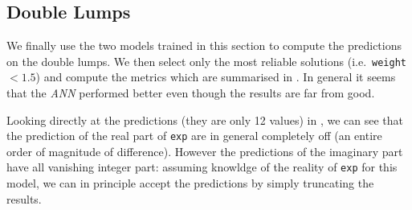 \subsection{Double Lumps}

We finally use the two models trained in this section to compute the predictions on the double lumps.
We then select only the most reliable solutions (i.e.\ \texttt{weight} $< 1.5$) and compute the metrics which are summarised in .
In general it seems that the \emph{ANN} performed better even though the results are far from good.

\begin{table}[htbp]
  \centering
  \caption{Metrics computed on the double lumps.}
  \label{tab:agg:dlumps}
\end{table}

Looking directly at the predictions (they are only 12 values) in , we can see that the prediction of the real part of \texttt{exp} are in general completely off (an entire order of magnitude of difference).
However the predictions of the imaginary part have all vanishing integer part: assuming knowldge of the reality of \texttt{exp} for this model, we can in principle accept the predictions by simply truncating the results.\footnotemark{}

